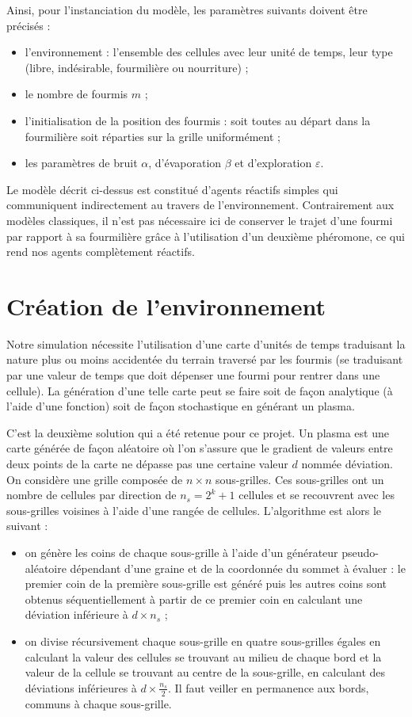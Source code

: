 \documentclass[11pt]{article}
\begin{document}
Ainsi, pour l'instanciation du modèle, les paramètres suivants doivent être précisés :
\begin{itemize}
  \item l'environnement : l'ensemble des cellules avec leur unité de temps, leur type (libre, indésirable, fourmilière ou nourriture) ;
  \item le nombre de fourmis $m$ ;
  \item l'initialisation de la position des fourmis : soit toutes au départ dans la fourmilière soit réparties sur la grille uniformément ;
  \item les paramètres de bruit $\alpha$, d'évaporation $\beta$ et d'exploration $\varepsilon$.
\end{itemize}

Le modèle décrit ci-dessus est constitué d'agents réactifs simples qui communiquent indirectement au travers de l'environnement. Contrairement aux modèles classiques, il n'est pas nécessaire ici de conserver le trajet d'une fourmi par rapport à sa fourmilière grâce à l'utilisation d'un deuxième phéromone, ce qui rend nos agents complètement réactifs.

\section{Création de l'environnement}
Notre simulation nécessite l'utilisation d'une carte d'unités de temps traduisant la nature plus ou moins accidentée du terrain traversé par les fourmis (se traduisant par une valeur de temps que doit dépenser une fourmi pour rentrer dans une cellule). La génération d'une telle carte peut se faire soit de façon analytique (à l'aide d'une fonction) soit de façon stochastique en générant un plasma.

C'est la deuxième solution qui a été retenue pour ce projet. Un plasma est une carte générée de façon aléatoire où l'on s'assure que le gradient de valeurs entre deux points de la carte ne dépasse pas une certaine valeur $d$ nommée déviation. On considère une grille composée de $n \times n$ sous-grilles. Ces sous-grilles ont un nombre de cellules par direction de $n_s = 2^k + 1$ cellules et se recouvrent avec les sous-grilles voisines à l'aide d'une rangée de cellules. L'algorithme est alors le suivant :
\begin{itemize}
  \item on génère les coins de chaque sous-grille à l'aide d'un générateur pseudo-aléatoire dépendant d'une graine et de la coordonnée du sommet à évaluer : le premier coin de la première sous-grille est généré puis les autres coins sont obtenus séquentiellement à partir de ce premier coin en calculant une déviation inférieure à $d \times n_s$ ;
  \item on divise récursivement chaque sous-grille en quatre sous-grilles égales en calculant la valeur des cellules se trouvant au milieu de chaque bord et la valeur de la cellule se trouvant au centre de la sous-grille, en calculant des déviations inférieures à $d \times \tfrac{n_s}{2}$. Il faut veiller en permanence aux bords, communs à chaque sous-grille.
\end{itemize}
\end{document}
